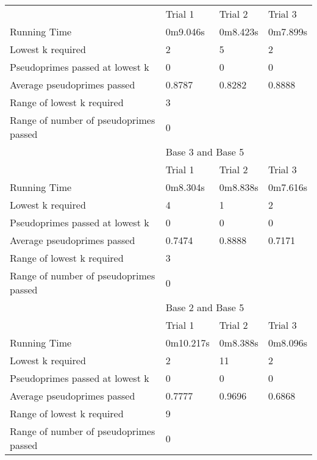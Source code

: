\documentclass{article}
\begin{document}
\begin{appendices}
\begin{longtable}{llll}
\midrule
                                       & Trial 1   & Trial 2  & Trial 3         \\
Running Time                           & 0m9.046s  & 0m8.423s & 0m7.899s        \\
Lowest k required                      & 2         & 5        & 2               \\
Pseudoprimes passed at lowest k        & 0         & 0        & 0               \\
Average pseudoprimes passed            & 0.8787    & 0.8282   & 0.8888          \\
\cmidrule(lr){2-2}\cmidrule(lr){3-3}\cmidrule(lr){4-4}
Range of lowest k required             & \multicolumn{3}{l}{3}                  \\
Range of number of pseudoprimes passed & \multicolumn{3}{l}{0}                  \\
\midrule
                                       & \multicolumn{3}{l}{Base 3 and Base 5}  \\
\midrule
                                       & Trial 1   & Trial 2  & Trial 3         \\
Running Time                           & 0m8.304s  & 0m8.838s & 0m7.616s        \\
Lowest k required                      & 4         & 1        & 2               \\
Pseudoprimes passed at lowest k        & 0         & 0        & 0               \\
Average pseudoprimes passed            & 0.7474    & 0.8888   & 0.7171          \\
\cmidrule(lr){2-2}\cmidrule(lr){3-3}\cmidrule(lr){4-4}
Range of lowest k required             & \multicolumn{3}{l}{3}                  \\
Range of number of pseudoprimes passed & \multicolumn{3}{l}{0}                  \\
\midrule
                                       & \multicolumn{3}{l}{Base 2 and Base 5}  \\
\midrule
                                       & Trial 1   & Trial 2  & Trial 3         \\
Running Time                           & 0m10.217s & 0m8.388s & 0m8.096s        \\
Lowest k required                      & 2         & 11       & 2               \\
Pseudoprimes passed at lowest k        & 0         & 0        & 0               \\
Average pseudoprimes passed            & 0.7777    & 0.9696   & 0.6868          \\
\cmidrule(lr){2-2}\cmidrule(lr){3-3}\cmidrule(lr){4-4}
Range of lowest k required             & \multicolumn{3}{l}{9}                  \\
Range of number of pseudoprimes passed & \multicolumn{3}{l}{0}                  \\
\bottomrule
\end{longtable}
\FloatBarrier


\end{appendices}
\end{document}
